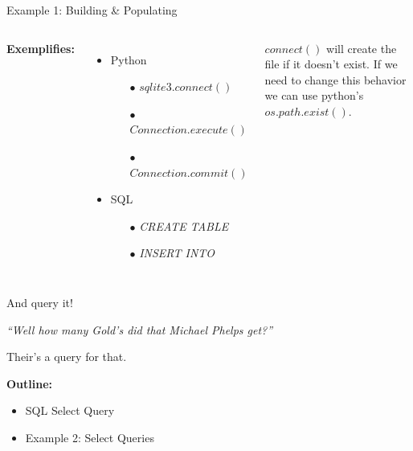 \documentclass{beamer}
\begin{document}
\begin{frame}{Example 1: Building \& Populating}

\begin{columns}
 \scriptsize

{\bf Exemplifies:}
\begin{itemize} \setlength\itemindent{-5pt}%
	\item Python
	\begin{itemize} \setlength\itemindent{-20pt} \scriptsize
		\item[$\bullet$] $sqlite3.connect()$
		\item[$\bullet$] $Connection.execute()$
		\item[$\bullet$] $Connection.commit()$
	\end{itemize}
	\item SQL
	\begin{itemize}\setlength\itemindent{-20pt} \scriptsize
		\item[$\bullet$] \textit{CREATE TABLE}
		\item[$\bullet$] \textit{INSERT INTO}
	\end{itemize}
\end{itemize}

\vspace{12pt}$connect()$ will create the file if it doesn't exist. If we need to change this behavior we can use python's $os.path.exist()$.



\end{columns}
\end{frame}
\begin{frame}{And query it!}

\textit{``Well how many Gold's did that Michael Phelps get?''}

\vspace{12pt}\hspace{4cm} Their's a query for that.

\vspace{12pt}
\large {\bf Outline:}
\begin{itemize}
\item SQL Select Query
\item Example 2: Select Queries
\end{itemize}

\end{frame}
\end{document}
